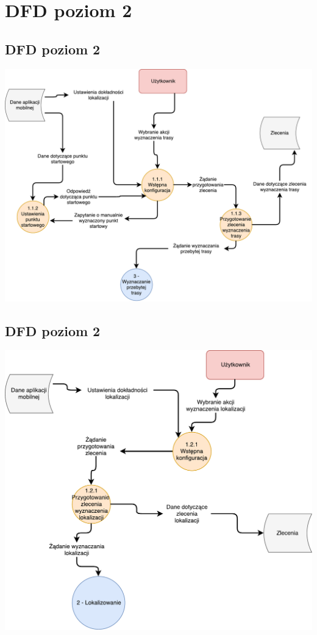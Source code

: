 \documentclass[11pt]{article}
\begin{document}
	\section{DFD poziom 2}
	\subsection{DFD poziom 2 }
	\begin{center}
		\includegraphics[scale=0.6]{DFD11.pdf}
	\end{center}
	\subsection{DFD poziom 2}
	\begin{center}
		\includegraphics[scale=0.7]{DFD12.pdf}
	\end{center}
	\newpage
\end{document}
